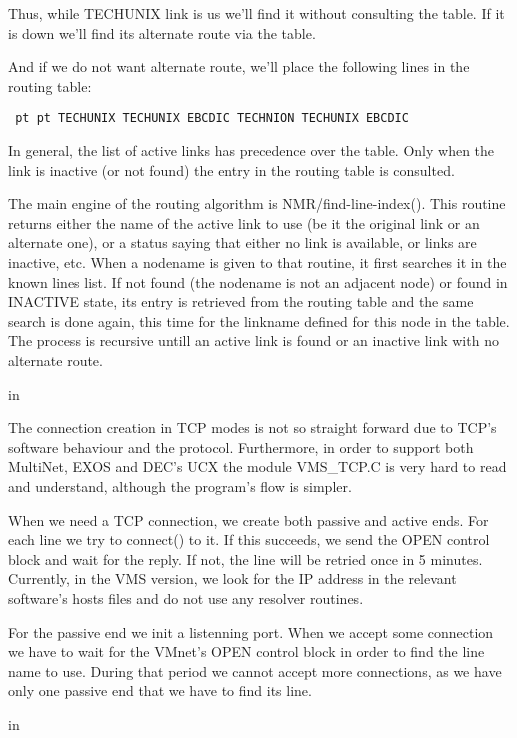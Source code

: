 Thus, while TECHUNIX link is us we'll find it without  consulting the
table. If it is down we'll find its alternate route via the table.

And if we do not want alternate route, we'll place the  following  lines
in the routing table:

{\obeylines\obeyspaces\tt{} pt  pt
TECHUNIX   TECHUNIX    EBCDIC
TECHNION   TECHUNIX    EBCDIC
}

In  general,  the list of active links has precedence over the table.
Only when the link is inactive (or not found) the entry in  the  routing
table is consulted.

The  main  engine  of the routing algorithm is NMR/find-line-index().
This routine returns either the name of the active link to  use  (be  it
the  original  link or an alternate one), or a status saying that either
no link is available, or links are inactive, etc.
When a nodename is given to that routine, it first searches it in the
known lines list. If not found (the nodename is not an adjacent node) or
found in INACTIVE state, its entry is retrieved from the  routing  table
and  the  same  search is done again, this time for the linkname defined
for this node in the table. The process is recursive  untill  an  active
link is found or an inactive link with no alternate route.

 in

The  connection  creation in TCP modes is not so straight forward due
to TCP's software behaviour and the protocol. Furthermore, in  order  to
support  both  MultiNet, EXOS and DEC's UCX the module VMS\_TCP.C is very
hard to read and understand, although the program's flow is simpler.

When we need a TCP connection, we  create  both  passive  and  active
ends. For each line we try to connect() to it. If this succeeds, we send
the OPEN control block and wait for the reply. If not, the line will  be
retried  once  in  5 minutes. Currently, in the VMS version, we look for
the IP address in the relevant software's hosts files and do not use any
resolver routines.

For  the  passive  end we init a listenning port. When we accept some
connection we have to wait for the VMnet's OPEN control block  in  order
to  find  the line name to use. During that period we cannot accept more
connections, as we have only one passive end that we have  to  find  its
line.

 in


